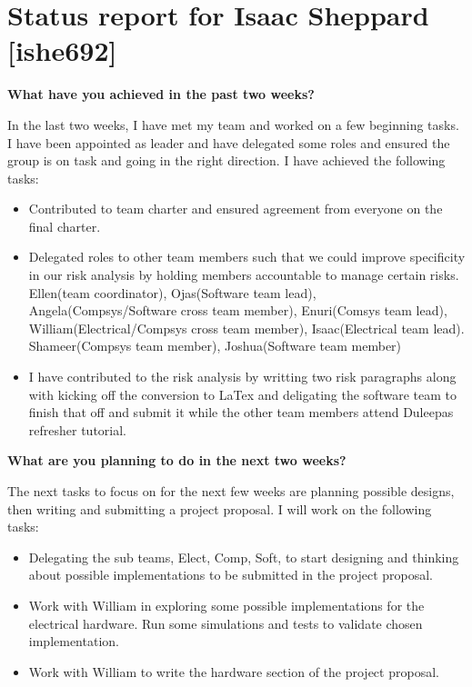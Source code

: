 \documentclass[11pt,a4paper]{article}
\newcommand{\name}{Isaac Sheppard}
\newcommand{\upi}{ishe692}
\begin{document}
\section*{Status report for \name{} [\upi]}

\textbf{What have you achieved in the past two weeks?}


In the last two weeks, I have met my team and worked on a few beginning tasks. I have been appointed as leader and have delegated some roles and ensured the group is on task and going in the right direction. I have achieved the following tasks:

\begin{itemize}

\item Contributed to team charter and ensured agreement from everyone on the final charter.

\item Delegated roles to other team members such that we could improve specificity in our risk analysis by holding members accountable to manage certain risks. Ellen(team coordinator), Ojas(Software team lead), Angela(Compsys/Software cross team member), Enuri(Comsys team lead), William(Electrical/Compsys cross team member), Isaac(Electrical team lead). Shameer(Compsys team member), Joshua(Software team member)  

\item I have contributed to the risk analysis by writting two risk paragraphs along with kicking off the conversion to LaTex and deligating the software team to finish that off and submit it while the other team members attend Duleepas refresher tutorial.

\end{itemize}

\textbf{What are you planning to do in the next two weeks?}

The next tasks to focus on for the next few weeks are planning possible designs, then writing and submitting a project proposal. I will work on the following tasks:

\begin{itemize}
\item Delegating the sub teams, Elect, Comp, Soft, to start designing and thinking about possible implementations to be submitted in the project proposal.

\item Work with William in exploring some possible implementations for the electrical hardware. Run some simulations and tests to validate chosen implementation.

\item Work with William to write the hardware section of the project proposal.


\end{itemize}
\end{document}
